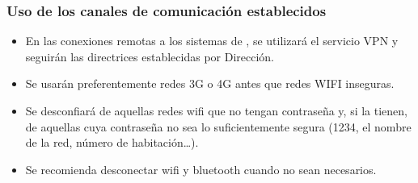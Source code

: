 
\subsubsection{Uso de los canales de comunicación establecidos}

\begin{itemize}
    \item En las conexiones remotas a los sistemas de \Beneficiario{}, se utilizará el servicio VPN y seguirán las directrices establecidas por Dirección.
    \item Se usarán preferentemente redes 3G o 4G antes que redes WIFI inseguras.
    \item Se desconfiará de aquellas redes wifi que no tengan contraseña y, si la tienen, de aquellas cuya contraseña no sea lo suficientemente segura (1234, el nombre de la red, número de habitación…).
    \item Se recomienda desconectar wifi y bluetooth cuando no sean necesarios.
\end{itemize}
